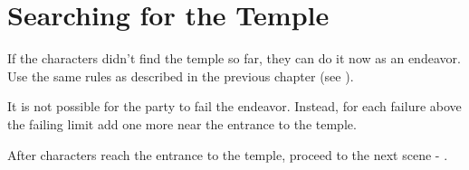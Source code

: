 \section{Searching for the Temple}

If the characters didn't find the temple so far, they can do it now as an endeavor. Use the same rules as described in the previous chapter (see ).

It is not possible for the party to fail the endeavor. Instead, for each failure above the failing limit add one more \enemyReanimatedRemains{} near the entrance to the temple. 

After characters reach the entrance to the temple, proceed to the next scene - .

